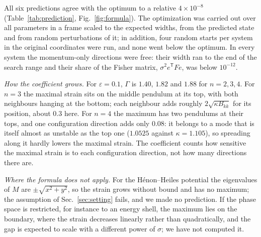 \begin{observation}[Predictions]
\label{obs:prediction}
All six predictions agree with the optimum to a relative $4\times10^{-8}$ (Table~\ref{tab:prediction}, Fig.~\ref{fig:formula}). The optimization was carried out over all parameters in a frame scaled to the expected widths, from the predicted state and from random perturbations of it; in addition, four random starts per system in the original coordinates were run, and none went below the optimum. In every system the momentum-only directions were free: their width ran to the end of the search range and their share of the Fisher matrix, $\sigma^2 e^{\mathsf T}Fe$, was below $10^{-12}$.
\end{observation}

\emph{How the coefficient grows.} For $\varepsilon = 0.1$, $\Gamma$ is $1.40$, $1.82$ and $1.88$ for $n = 2, 3, 4$. For $n = 3$ the maximal strain sits on the middle pendulum at its top, with both neighbours hanging at the bottom; each neighbour adds roughly $2\sqrt{\kappa B_{kk}}$ for its position, about $0.3$ here. For $n = 4$ the maximum has two pendulums at their tops, and one configuration direction adds only $0.08$: it belongs to a mode that is itself almost as unstable as the top one ($1.0525$ against $\kappa = 1.105$), so spreading along it hardly lowers the maximal strain. The coefficient counts how sensitive the maximal strain is to each configuration direction, not how many directions there are.

\emph{Where the formula does not apply.} For the H\'enon--Heiles potential the eigenvalues of $M$ are $\pm\sqrt{x^2+y^2}$, so the strain grows without bound and has no maximum; the assumption of Sec.~\ref{sec:setting} fails, and we made no prediction. If the phase space is restricted, for instance to an energy shell, the maximum lies on the boundary, where the strain decreases linearly rather than quadratically, and the gap is expected to scale with a different power of $\sigma$; we have not computed it.
